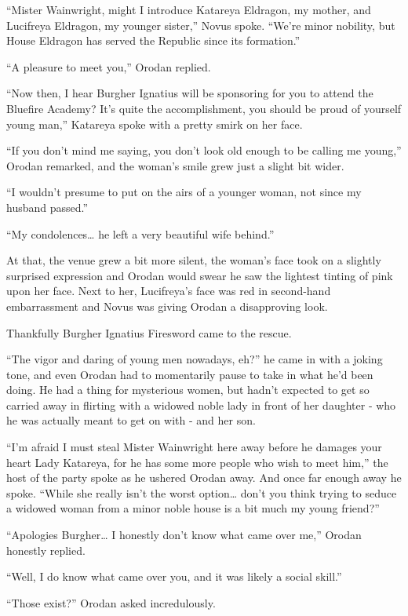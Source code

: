 \documentclass[a4paper,10pt]{book}
\begin{document}
“Mister Wainwright, might I introduce Katareya Eldragon, my mother, and Lucifreya Eldragon, my younger sister,” Novus spoke. “We’re minor nobility, but House Eldragon has served the Republic since its formation.”\par
“A pleasure to meet you,” Orodan replied.\par
“Now then, I hear Burgher Ignatius will be sponsoring for you to attend the Bluefire Academy? It’s quite the accomplishment, you should be proud of yourself young man,” Katareya spoke with a pretty smirk on her face.\par
“If you don’t mind me saying, you don’t look old enough to be calling me young,” Orodan remarked, and the woman’s smile grew just a slight bit wider.\par
“I wouldn’t presume to put on the airs of a younger woman, not since my husband passed.”\par
“My condolences… he left a very beautiful wife behind.”\par
At that, the venue grew a bit more silent, the woman’s face took on a slightly surprised expression and Orodan would swear he saw the lightest tinting of pink upon her face. Next to her, Lucifreya’s face was red in second-hand embarrassment and Novus was giving Orodan a disapproving look.\par
Thankfully Burgher Ignatius Firesword came to the rescue.\par
“The vigor and daring of young men nowadays, eh?” he came in with a joking tone, and even Orodan had to momentarily pause to take in what he’d been doing. He had a thing for mysterious women, but hadn’t expected to get so carried away in flirting with a widowed noble lady in front of her daughter - who he was actually meant to get on with - and her son.\par
“I’m afraid I must steal Mister Wainwright here away before he damages your heart Lady Katareya, for he has some more people who wish to meet him,” the host of the party spoke as he ushered Orodan away. And once far enough away he spoke. “While she really isn’t the worst option… don’t you think trying to seduce a widowed woman from a minor noble house is a bit much my young friend?”\par
“Apologies Burgher… I honestly don’t know what came over me,” Orodan honestly replied.\par
“Well, I do know what came over you, and it was likely a social skill.”\par
“Those exist?” Orodan asked incredulously.\par
\end{document}
